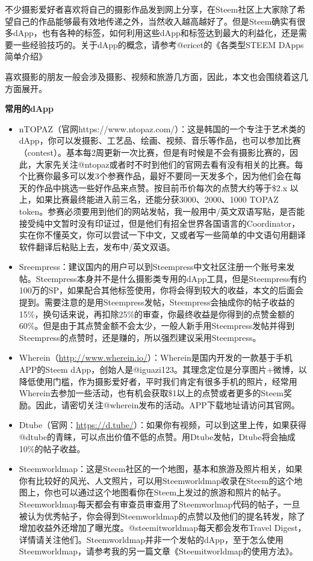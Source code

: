 \documentclass[]{ctexbook}
\begin{document}
不少摄影爱好者喜欢将自己的摄影作品发到网上分享，在Steem社区上大家除了希望自己的作品能够最有效地传递之外，当然收入越高越好了。但是Steem确实有很多dApp，也有各种的标签，如何利用这些dApp和标签达到最大的利益化，还是需要一些经验技巧的。关于dApp的概念，请参考@ericet的《各类型STEEM DApps简单介绍》

喜欢摄影的朋友一般会涉及摄影、视频和旅游几方面，因此，本文也会围绕着这几方面展开。

\textbf{常用的dApp}

\begin{itemize}
\item
  nTOPAZ（官网https://www.ntopaz.com/）：这是韩国的一个专注于艺术类的dApp，你可以发摄影、工艺品、绘画、视频、音乐等作品，也可以参加比赛（contest）。基本每2周更新一次比赛，但是有时候是不会有摄影比赛的，因此，大家先关注@ntopaz或者时不时到他们的官网去看有没有相关的比赛。每个比赛你最多可以发3个参赛作品，最好不要同一天发多个，因为他们会在每天的作品中挑选一些好作品来点赞。按目前币价每次的点赞大约等于\$2.x 以上，如果比赛最终能进入前三名，还能分获3000、2000、1000 TOPAZ token。参赛必须要用到他们的网站发帖，我一般用中/英文双语写贴，是否能接受纯中文暂时没有印证过，但是他们有招全世界各国语言的Coordinator，实在你不懂英文，你可以尝试一下中文，又或者写一些简单的中文语句用翻译软件翻译后粘贴上去，发布中/英文双语。
\item
  Sreempress：建议国内的用户可以到Steempress中文社区注册一个账号来发帖。Steempress本身并不是什么摄影类专用的dApp工具，但是Steempress有约100万的SP，如果配合其他标签使用，你将会得到较大的收益，本文的后面会提到。需要注意的是用Steempress发帖，Steempress会抽成你的帖子收益的15\%，换句话来说，再扣除25\%的审查，你最终收益是你得到的点赞金额的60\%。但是由于其点赞金额不会太少，一般人新手用Steempress发帖并得到Steempress的点赞时，还是赚的，所以强烈建议采用Steempress。
\item
  Wherein（\url{http://www.wherein.io/}）：Wherein是国内开发的一款基于手机APP的Steem dApp，创始人是@iguazi123。其理念定位是分享图片+微博，以降低使用门槛，作为摄影爱好者，平时我们肯定有很多手机的照片，经常用Wherein去参加一些活动，也有机会获取\$1以上的点赞或者更多的Steem奖励。因此，请密切关注@wherein发布的活动。APP下载地址请访问其官网。
\item
  Dtube（官网：\url{https://d.tube/}）：如果你有视频，可以到这里上传，如果获得@dtube的青睐，可以点出价值不低的点赞。用Dtube发帖，Dtube将会抽成10\%的帖子收益。
\item
  Steemworldmap：这是Steem社区的一个地图，基本和旅游及照片相关，如果你有比较好的风光、人文照片，可以用Steemworldmap收录在Steem的这个地图上，你也可以通过这个地图看你在Steem上发过的旅游和照片的帖子。Steemworldmap每天都会有审查员审查用了Steemworlmap代码的帖子，一旦被认为优秀帖子，你会得到Steemworldmap的点赞以及他们的提名转发，除了增加收益外还增加了曝光度。@steemitworldmap每天都会发布Travel Digest，详情请关注他们。Steemworldmap并非一个发帖的dApp，至于怎么使用Steemworldmap，请参考我的另一篇文章《Steemitworldmap的使用方法》。
\end{itemize}
\end{document}
